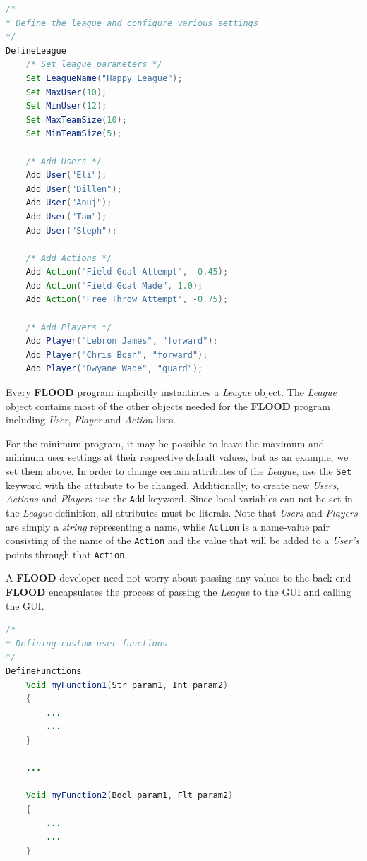 \documentclass[12pt]{report}
\begin{document}
\begin{singlespace}
\begin{lstlisting}[language=Java,label=some-code,caption={Defining the league and setting parameters.}]
/*
* Define the league and configure various settings
*/
DefineLeague
	/* Set league parameters */
	Set LeagueName("Happy League");
	Set MaxUser(10);
	Set MinUser(12);
	Set MaxTeamSize(10);
	Set MinTeamSize(5);
	
	/* Add Users */
	Add User("Eli");
	Add User("Dillen");
	Add User("Anuj");
	Add User("Tam");
	Add User("Steph");

	/* Add Actions */
	Add Action("Field Goal Attempt", -0.45);
	Add Action("Field Goal Made", 1.0);
	Add Action("Free Throw Attempt", -0.75);

	/* Add Players */
	Add Player("Lebron James", "forward");
	Add Player("Chris Bosh", "forward");
	Add Player("Dwyane Wade", "guard");
\end{lstlisting}
\end{singlespace}

Every \textbf{FLOOD} program implicitly instantiates a \textit{League} object. The \textit{League} object contains most of the other objects needed for the \textbf{FLOOD} program including \textit{User}, \textit{Player} and \textit{Action} lists.

For the minimum program, it may be possible to leave the maximum and mininum user settings at their respective default values, but as an example, we set them above. In order to change certain attributes of the \textit{League}, use the \texttt{Set} keyword with the attribute to be changed. Additionally, to create new \textit{Users}, \textit{Actions} and \textit{Players} use the \texttt{Add} keyword. Since local variables can not be set in the \textit{League} definition, all attributes must be literals. Note that \textit{Users} and \textit{Players} are simply a \textit{string} representing a name, while \texttt{Action} is a name-value pair consisting of the name of the \texttt{Action} and the value that will be added to a \textit{User's} points through that \texttt{Action}.

A \textbf{FLOOD} developer need not worry about passing any values to the back-end---\textbf{FLOOD} encapsulates the process of passing the \textit{League} to the GUI and calling the GUI.

\begin{singlespace}
\begin{lstlisting}[language=Java,label=some-code,caption={Defining functions.}]
/*
* Defining custom user functions
*/
DefineFunctions
	Void myFunction1(Str param1, Int param2)
	{
		...
		...
	}

	...

	Void myFunction2(Bool param1, Flt param2)
	{
		...
		...
	}
\end{lstlisting}
\end{singlespace}
\end{document}
